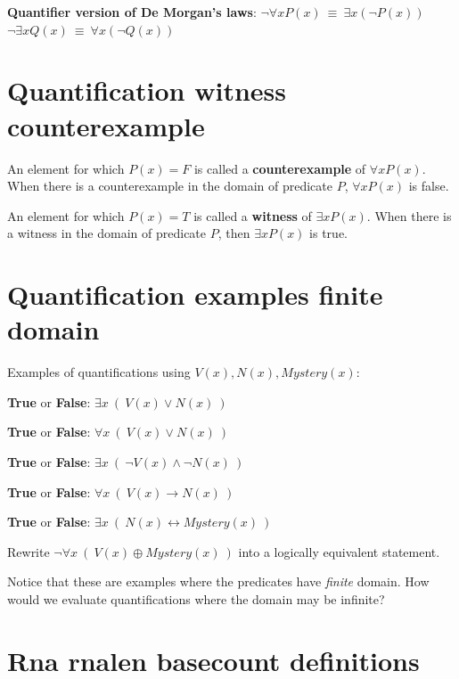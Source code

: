 \documentclass[12pt, oneside]{article}
\begin{document}
{\bf Quantifier version of De Morgan's laws}: 
$\boxed{\neg \forall x P(x) ~\equiv~ \exists x \left( \neg P(x) \right)}$
\qquad
\qquad
$\boxed{\neg \exists x Q(x) ~\equiv~ \forall x \left( \neg Q(x) \right)}$
 \vfill
\section*{Quantification witness counterexample}


An element for which $P(x) = F$ is called a {\bf counterexample} of $\forall x P(x)$. When there is a counterexample in the domain of predicate $P$,  $\forall x P(x)$ is false.


An element for which $P(x) = T$ is called a {\bf witness} of $\exists x P(x)$. When there is a witness in the domain of predicate $P$, then $\exists x P(x)$ is true.
 \vfill
\section*{Quantification examples finite domain}


Examples of quantifications using $V(x), N(x), Mystery(x)$:



{\bf True} or {\bf False}: $\exists x~ (~V(x) \lor N(x)~)$

\vfill


{\bf True} or {\bf False}: $\forall x~ (~V(x) \lor N(x)~)$

\vfill


{\bf True} or {\bf False}: $\exists x~ (~\lnot V(x) \land \lnot N(x)~)$

\vfill

{\bf True} or {\bf False}: $\forall x~ (~V(x) \to N(x)~)$

\vfill

{\bf True} or {\bf False}: $\exists x~ (~N(x) \leftrightarrow Mystery(x)~)$

\vfill

Rewrite $\lnot \forall x~(~V(x) \oplus Mystery(x)~)$ into a logically equivalent statement.

\vspace{50pt}


Notice that these are examples where the predicates have {\it finite} domain.
How would we evaluate quantifications where the domain may be infinite?

\vfill

 \vfill
\section*{Rna rnalen basecount definitions}
\end{document}
